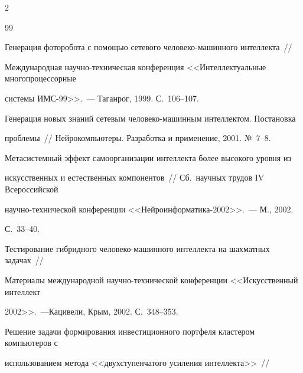 \begin{multicols}{2}
{{\begin{thebibliography}{99}




Генерация фоторобота с помощью сетевого че\-ло\-ве\-ко-ма\-шин\-но\-го интеллекта~// 


Международная на\-уч\-но-тех\-ни\-че\-ская конференция <<Интеллектуальные многопроцессорные 


системы ИМС-99>>.~--- Таганрог, 1999. С.~106--107.









Генерация новых знаний сетевым че\-ло\-ве\-ко-машинным интеллектом. Постановка 


проб\-ле\-мы~// Нейрокомпьютеры. Разработка и применение, 2001. № \,7--8.









Метасистемный эффект самоорганизации интеллекта более высокого уровня из 


искусственных и естественных компонентов~// Сб.\ научных трудов IV Всероссийской 


на\-уч\-но-тех\-ни\-че\-ской конференции <<Нейроинформатика-2002>>.~--- М., 2002. 


С.~33--40.









Тестирование гибридного человеко-машинного интеллекта на шахматных задачах~//\linebreak 


Материалы международной научно-технической конференции <<Искусственный интеллект 


2002>>.~---\linebreak Кацивели, Крым, 2002. С.~348--353.









Решение задачи формирования инвестиционного портфеля кластером компьютеров с 


использованием метода <<двухступенчатого усиления интеллекта>>~//\linebreak



\end{thebibliography}}}
\end{multicols}
